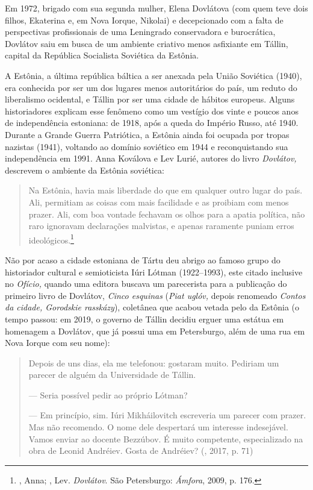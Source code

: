 Em 1972, brigado com sua segunda mulher, Elena Dovlátova (com quem teve
dois filhos, Ekaterina e, em Nova Iorque, Nikolai) e decepcionado com a
falta de perspectivas profissionais de uma Leningrado conservadora e
burocrática, Dovlátov saiu em busca de um ambiente criativo
menos asfixiante em Tállin, capital da República Socialista Soviética da
Estônia.

A Estônia, a última república báltica a ser anexada pela União Soviética
(1940), era conhecida por ser um dos lugares menos autoritários do país,
um reduto do liberalismo ocidental, e Tállin por ser uma cidade de
hábitos europeus. Alguns historiadores explicam esse fenômeno como um
vestígio dos vinte e poucos anos de independência estoniana: de 1918,
após a queda do Império Russo, até 1940. Durante a Grande Guerra
Patriótica, a Estônia ainda foi ocupada por tropas nazistas (1941),
voltando ao domínio soviético em 1944 e reconquistando sua independência
em 1991. Anna Koválova e Lev Lurié, autores do livro \emph{Dovlátov,}
descrevem o ambiente da Estônia soviética:

\begin{quotation}
Na Estônia, havia mais liberdade do que em qualquer outro lugar do país.
Ali, permitiam as coisas com mais facilidade e as proibiam com menos
prazer. Ali, com boa vontade fechavam os olhos para a apatia política,
não raro ignoravam declarações malvistas, e apenas raramente puniam
erros ideológicos.\footnote{, Anna; , Lev. \emph{Dovlátov}.
  São Petersburgo: \emph{Ámfora}, 2009, p. 176.}
\end{quotation}

Não por acaso a cidade estoniana de Tártu deu abrigo ao famoso grupo do
historiador cultural e semioticista Iúri Lótman (1922--1993), este
citado inclusive no \emph{Ofício,} quando uma editora buscava um
parecerista para a publicação do primeiro livro de Dovlátov, \emph{Cinco
esquinas} (\emph{Piat uglóv,} depois renomeado \emph{Contos da cidade,
Gorodskie rasskázy}), coletânea que acabou vetada pelo  da
Estônia (o tempo passou: em 2019, o governo de Tállin decidiu erguer uma
estátua em homenagem a Dovlátov, que já possui uma em Petersburgo, além
de uma rua em Nova Iorque com seu nome):

\begin{quotation}
Depois de uns dias, ela me telefonou: gostaram muito. Pe­diriam um
parecer de alguém da Universidade de Tállin.

--- Seria possível pedir ao próprio Lótman?

--- Em princípio, sim. Iúri Mikháilovitch escreveria um pa­recer com
prazer. Mas não recomendo. O nome dele despertará um interesse
indesejável. Vamos enviar ao docente Bezzúbov. É muito competente,
especializado na obra de Leonid Andréiev. Gosta de Andréiev? 
{}(, 2017, p. 71)
\end{quotation}


